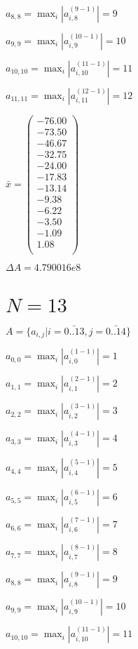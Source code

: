 \documentclass[a4paper,12pt]{article}
\begin{document}
$a _{ 8, 8 } =  \max _i |a _{ i, 8 } ^{ (9 - 1) } | = 9$

$a _{ 9, 9 } =  \max _i |a _{ i, 9 } ^{ (10 - 1) } | = 10$

$a _{ 10, 10 } =  \max _i |a _{ i, 10 } ^{ (11 - 1) } | = 11$

$a _{ 11, 11 } =  \max _i |a _{ i, 11 } ^{ (12 - 1) } | = 12$

$\bar { x } = \begin{pmatrix}
-76.00 \\
-73.50 \\
-46.67 \\
-32.75 \\
-24.00 \\
-17.83 \\
-13.14 \\
-9.38 \\
-6.22 \\
-3.50 \\
-1.09 \\
1.08 \\
\end{pmatrix}
$

$\Delta A = 4.790016e8$



\section{ $N = 13$ }
$A = \{ a _{ i, j } | i = \bar { 0..13 }, j = \bar { 0..14 } \}$

$a _{ 0, 0 } =  \max _i |a _{ i, 0 } ^{ (1 - 1) } | = 1$

$a _{ 1, 1 } =  \max _i |a _{ i, 1 } ^{ (2 - 1) } | = 2$

$a _{ 2, 2 } =  \max _i |a _{ i, 2 } ^{ (3 - 1) } | = 3$

$a _{ 3, 3 } =  \max _i |a _{ i, 3 } ^{ (4 - 1) } | = 4$

$a _{ 4, 4 } =  \max _i |a _{ i, 4 } ^{ (5 - 1) } | = 5$

$a _{ 5, 5 } =  \max _i |a _{ i, 5 } ^{ (6 - 1) } | = 6$

$a _{ 6, 6 } =  \max _i |a _{ i, 6 } ^{ (7 - 1) } | = 7$

$a _{ 7, 7 } =  \max _i |a _{ i, 7 } ^{ (8 - 1) } | = 8$

$a _{ 8, 8 } =  \max _i |a _{ i, 8 } ^{ (9 - 1) } | = 9$

$a _{ 9, 9 } =  \max _i |a _{ i, 9 } ^{ (10 - 1) } | = 10$

$a _{ 10, 10 } =  \max _i |a _{ i, 10 } ^{ (11 - 1) } | = 11$
\end{document}
